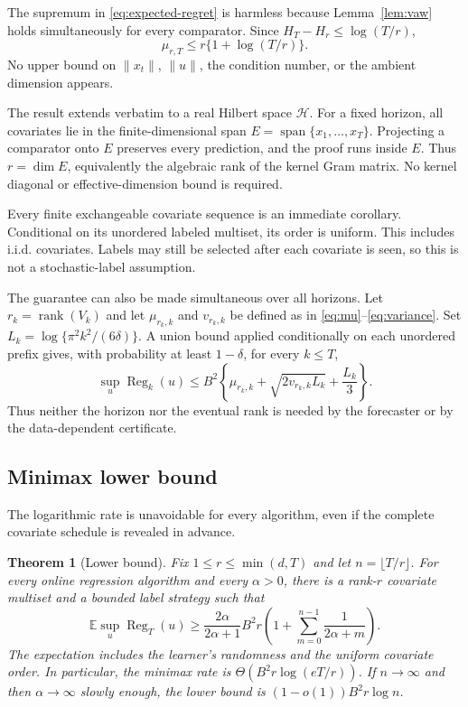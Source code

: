 \documentclass[twoside]{article}
\newtheorem{theorem}{Theorem}
\newcommand{\E}{\mathbb E}
\newcommand{\cH}{\mathcal H}
\newcommand{\rank}{\operatorname{rank}}
\newcommand{\Reg}{\operatorname{Reg}}
\begin{document}
The supremum in \eqref{eq:expected-regret} is harmless because Lemma~\ref{lem:vaw} holds simultaneously for every comparator. Since $H_T-H_r\le\log(T/r)$, \[ \mu_{r,T}\le r\{1+\log(T/r)\}. \] No upper bound on $\|x_t\|$, $\|u\|$, the condition number, or the ambient dimension appears.

The result extends verbatim to a real Hilbert space $\cH$. For a fixed horizon, all covariates lie in the finite-dimensional span $E=\operatorname{span}\{x_1,\ldots,x_T\}$. Projecting a comparator onto $E$ preserves every prediction, and the proof runs inside $E$. Thus $r=\dim E$, equivalently the algebraic rank of the kernel Gram matrix. No kernel diagonal or effective-dimension bound is required.

Every finite exchangeable covariate sequence is an immediate corollary. Conditional on its unordered labeled multiset, its order is uniform. This includes i.i.d. covariates. Labels may still be selected after each covariate is seen, so this is not a stochastic-label assumption.

The guarantee can also be made simultaneous over all horizons. Let $r_k=\rank(V_k)$ and let $\mu_{r_k,k}$ and $v_{r_k,k}$ be defined as in \eqref{eq:mu}--\eqref{eq:variance}. Set $L_k=\log\{\pi^2k^2/(6\delta)\}$. A union bound applied conditionally on each unordered prefix gives, with probability at least $1-\delta$, for every $k\le T$,
\begin{equation}
 \sup_u\Reg_k(u)\le B^2\left\{\mu_{r_k,k}
 +\sqrt{2v_{r_k,k}L_k}+\frac{L_k}{3}\right\}.
 \label{eq:anytime}
\end{equation}
Thus neither the horizon nor the eventual rank is needed by the forecaster or by the data-dependent certificate.

\subsection{Minimax lower bound}

The logarithmic rate is unavoidable for every algorithm, even if the complete covariate schedule is revealed in advance.

\begin{theorem}[Lower bound]
\label{thm:lower}
Fix $1\le r\le\min(d,T)$ and let $n=\lfloor T/r\rfloor$. For every online regression algorithm and every $\alpha>0$, there is a rank-$r$ covariate multiset and a bounded label strategy such that
\begin{equation}
 \E\sup_u\Reg_T(u)
 \ge \frac{2\alpha}{2\alpha+1}B^2r
 \left(1+\sum_{m=0}^{n-1}\frac1{2\alpha+m}\right).
 \label{eq:lower}
\end{equation}
The expectation includes the learner's randomness and the uniform covariate order. In particular, the minimax rate is $\Theta(B^2r\log(eT/r))$. If $n\to\infty$ and then $\alpha\to\infty$ slowly enough, the lower bound is $(1-o(1))B^2r\log n$.
\end{theorem}
\end{document}
